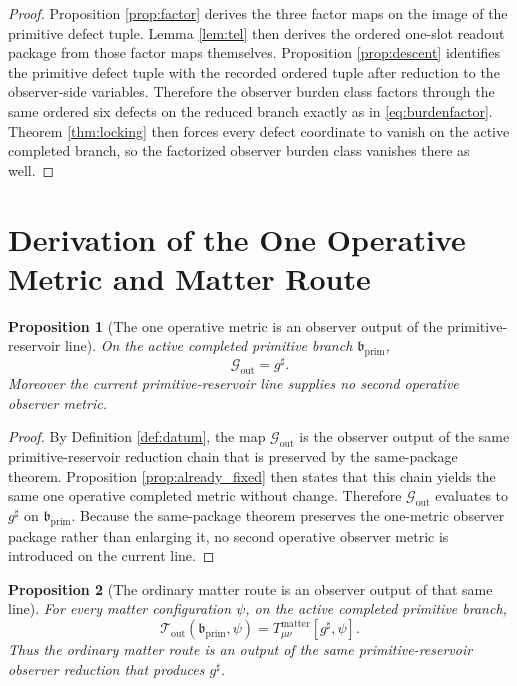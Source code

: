 \documentclass[11pt]{article}
\newcommand{\CompletedMetric}{g^{\sharp}}
\newcommand{\PrimBranch}{\mathfrak b_{\mathrm{prim}}}
\newcommand{\MetricOut}{\mathscr G_{\mathrm{out}}}
\newcommand{\MatterOut}{\mathscr T_{\mathrm{out}}}
\newtheorem{proposition}{Proposition}
\begin{document}
\begin{proof}
Proposition \ref{prop:factor} derives the three factor maps on the image of the primitive defect tuple. Lemma \ref{lem:tel} then derives the ordered one-slot readout package from those factor maps themselves. Proposition \ref{prop:descent} identifies the primitive defect tuple with the recorded ordered tuple after reduction to the observer-side variables. Therefore the observer burden class factors through the same ordered six defects on the reduced branch exactly as in \eqref{eq:burdenfactor}. Theorem \ref{thm:locking} then forces every defect coordinate to vanish on the active completed branch, so the factorized observer burden class vanishes there as well.
\end{proof}

\section{Derivation of the One Operative Metric and Matter Route}

\begin{proposition}[The one operative metric is an observer output of the primitive-reservoir line]
\label{prop:metric}
On the active completed primitive branch \(\PrimBranch\),
\[
\MetricOut=\CompletedMetric.
\]
Moreover the current primitive-reservoir line supplies no second operative observer metric.
\end{proposition}

\begin{proof}
By Definition \ref{def:datum}, the map \(\MetricOut\) is the observer output of the same primitive-reservoir reduction chain that is preserved by the same-package theorem. Proposition \ref{prop:already_fixed} then states that this chain yields the same one operative completed metric without change. Therefore \(\MetricOut\) evaluates to \(\CompletedMetric\) on \(\PrimBranch\). Because the same-package theorem preserves the one-metric observer package rather than enlarging it, no second operative observer metric is introduced on the current line.
\end{proof}

\begin{proposition}[The ordinary matter route is an observer output of that same line]
\label{prop:matter}
For every matter configuration \(\psi\), on the active completed primitive branch,
\[
\MatterOut(\PrimBranch,\psi)=T_{\mu\nu}^{\mathrm{matter}}[\CompletedMetric,\psi].
\]
Thus the ordinary matter route is an output of the same primitive-reservoir observer reduction that produces \(\CompletedMetric\).
\end{proposition}
\end{document}
